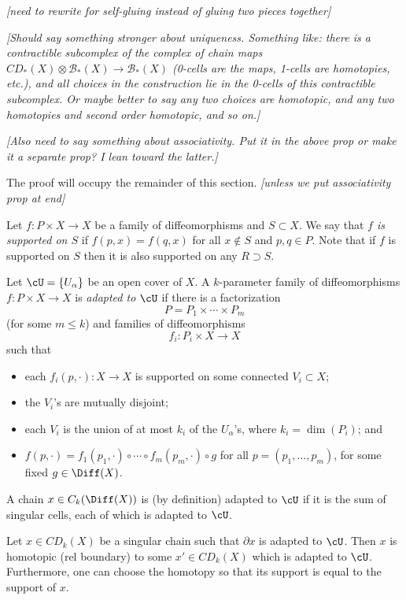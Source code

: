 \documentclass[11pt,leqno]{amsart}
\def\bc{{\mathcal B}}
\def\bd{\partial}
\def\sub{\subset}
\def\sup{\supset}
\def\nn#1{{{\it \small [#1]}}}
\newcommand{\eq}[1]{\begin{displaymath}#1\end{displaymath}}
\begin{document}
\nn{need to rewrite for self-gluing instead of gluing two pieces together}

\nn{Should say something stronger about uniqueness.
Something like: there is
a contractible subcomplex of the complex of chain maps
$CD_*(X) \otimes \bc_*(X) \to \bc_*(X)$ (0-cells are the maps, 1-cells are homotopies, etc.),
and all choices in the construction lie in the 0-cells of this
contractible subcomplex.
Or maybe better to say any two choices are homotopic, and
any two homotopies and second order homotopic, and so on.}

\nn{Also need to say something about associativity.
Put it in the above prop or make it a separate prop?
I lean toward the latter.}
\medskip

The proof will occupy the remainder of this section.
\nn{unless we put associativity prop at end}

\medskip

Let $f: P \times X \to X$ be a family of diffeomorphisms and $S \sub X$.
We say that {\it $f$ is supported on $S$} if $f(p, x) = f(q, x)$ for all
$x \notin S$ and $p, q \in P$.
Note that if $f$ is supported on $S$ then it is also supported on any $R \sup S$.

Let $\cU = \{U_\alpha\}$ be an open cover of $X$.
A $k$-parameter family of diffeomorphisms $f: P \times X \to X$ is
{\it adapted to $\cU$} if there is a factorization
\eq{
    P = P_1 \times \cdots \times P_m
}
(for some $m \le k$)
and families of diffeomorphisms
\eq{
    f_i :  P_i \times X \to X
}
such that
\begin{itemize}
\item each $f_i(p, \cdot): X \to X$ is supported on some connected $V_i \sub X$;
\item the $V_i$'s are mutually disjoint;
\item each $V_i$ is the union of at most $k_i$ of the $U_\alpha$'s,
where $k_i = \dim(P_i)$; and
\item $f(p, \cdot) = f_1(p_1, \cdot) \circ \cdots \circ f_m(p_m, \cdot) \circ g$
for all $p = (p_1, \ldots, p_m)$, for some fixed $g \in \Diff(X)$.
\end{itemize}
A chain $x \in C_k(\Diff(X))$ is (by definition) adapted to $\cU$ if it is the sum
of singular cells, each of which is adapted to $\cU$.

\begin{lemma}  \label{extension_lemma}
Let $x \in CD_k(X)$ be a singular chain such that $\bd x$ is adapted to $\cU$.
Then $x$ is homotopic (rel boundary) to some $x' \in CD_k(X)$ which is adapted to $\cU$.
Furthermore, one can choose the homotopy so that its support is equal to the support of $x$.
\end{lemma}
\end{document}
